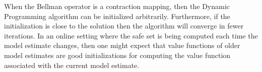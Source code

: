 \documentclass{journal}
\begin{document}
%

When the Bellman operator is a contraction mapping, then the Dynamic Programming algorithm can be initialized arbitrarily. Furthermore, if the initialization is close to the solution then the algorithm will converge in fewer iterations. In an online setting where the safe set is being computed each time the model estimate changes, then one might expect that value functions of older model estimates are good initializations for computing the value function associated with the current model estimate. 
\end{document}
